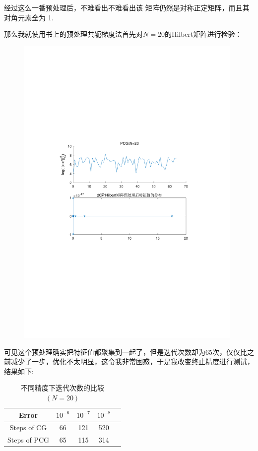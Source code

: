 经过这么一番预处理后，不难看出不难看出该
矩阵仍然是对称正定矩阵，而且其对角元素全为 1.

那么我就使用书上的预处理共轭梯度法首先对$N=20$的Hilbert矩阵进行检验：

\begin{figure}[H]
\centering
\includegraphics[width=11cm]{fig/5_7.pdf}
\end{figure}

可见这个预处理确实把特征值都聚集到一起了，但是迭代次数却为65次，仅仅比之前减少了一步，优化不太明显，这令我非常困惑，于是我改变终止精度进行测试，结果如下:

\begin{table}[htbp]
  \centering
  \caption{不同精度下迭代次数的比较$(N=20)$}
    \begin{tabular}{ccccc}
\toprule
{Error} &$10^{-6}$&$10^{-7}$& $10^{-8}$ \\
	\midrule
{Steps of CG}&66&121   & 520  \\
{Steps of PCG}&65&115   & 314 \\
\bottomrule
    \end{tabular}
\end{table}


